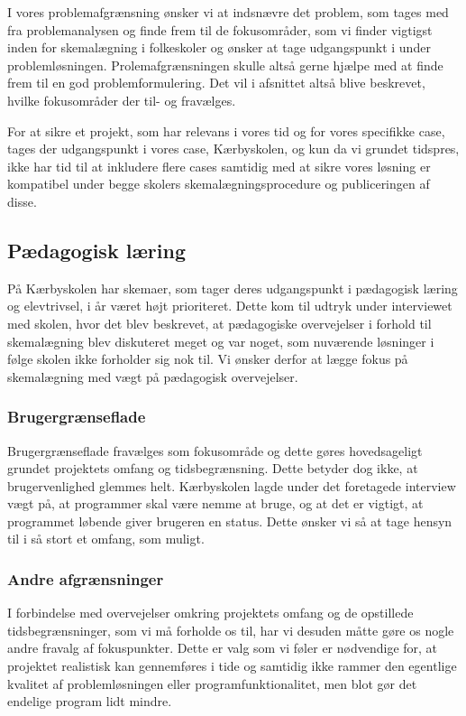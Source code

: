 \label{afg}
I vores problemafgrænsning ønsker vi at indsnævre det problem, som tages med fra problemanalysen og finde frem til de fokusområder, som vi finder vigtigst inden for skemalægning i folkeskoler og ønsker at tage udgangspunkt i under problemløsningen. Prolemafgrænsningen skulle altså gerne hjælpe med at finde frem til en god problemformulering. Det vil i afsnittet altså blive beskrevet, hvilke fokusområder der til- og fravælges.

For at sikre et projekt, som har relevans i vores tid og for vores specifikke case, tages der udgangspunkt i vores case, Kærbyskolen, og kun \school da vi grundet tidspres, ikke har tid til at inkludere flere cases samtidig med at sikre vores løsning er kompatibel under begge skolers skemalægningsprocedure og publiceringen af disse.

\subsection*{Pædagogisk læring}
På Kærbyskolen har skemaer, som tager deres udgangspunkt i pædagogisk læring og elevtrivsel, i år været højt prioriteret. Dette kom til udtryk under interviewet med skolen, hvor det blev beskrevet, at pædagogiske overvejelser i forhold til skemalægning blev diskuteret meget og var noget, som nuværende løsninger i følge skolen ikke forholder sig nok til. Vi ønsker derfor at lægge fokus på skemalægning med vægt på pædagogisk overvejelser.

\subsubsection*{Brugergrænseflade}
Brugergrænseflade fravælges som fokusområde og dette gøres hovedsageligt grundet projektets omfang og tidsbegrænsning. Dette betyder dog ikke, at brugervenlighed glemmes helt. Kærbyskolen lagde under det foretagede interview vægt på, at programmer skal være nemme at bruge, og at det er vigtigt, at programmet løbende giver brugeren en status. Dette ønsker vi så at tage hensyn til i så stort et omfang, som muligt.

\subsubsection*{Andre afgrænsninger}
I forbindelse med overvejelser omkring projektets omfang og de opstillede tidsbegrænsninger, som vi må forholde os til, har vi desuden måtte gøre os nogle andre fravalg af fokuspunkter. Dette er valg som vi føler er nødvendige for, at projektet realistisk kan gennemføres i tide og samtidig ikke rammer den egentlige kvalitet af problemløsningen eller programfunktionalitet, men blot gør det endelige program lidt mindre.

